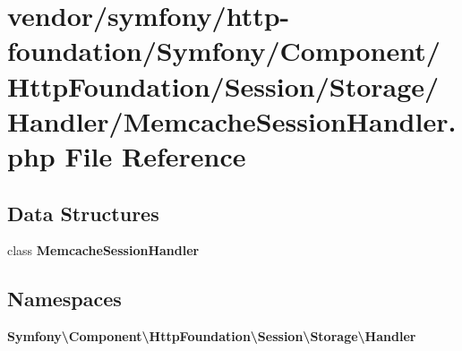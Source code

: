 \section{vendor/symfony/http-\/foundation/\+Symfony/\+Component/\+Http\+Foundation/\+Session/\+Storage/\+Handler/\+Memcache\+Session\+Handler.php File Reference}
\label{_memcache_session_handler_8php}
\subsection*{Data Structures}
\begin{DoxyCompactItemize}
\item 
class {\bf Memcache\+Session\+Handler}
\end{DoxyCompactItemize}
\subsection*{Namespaces}
\begin{DoxyCompactItemize}
\item 
 {\bf Symfony\textbackslash{}\+Component\textbackslash{}\+Http\+Foundation\textbackslash{}\+Session\textbackslash{}\+Storage\textbackslash{}\+Handler}
\end{DoxyCompactItemize}
